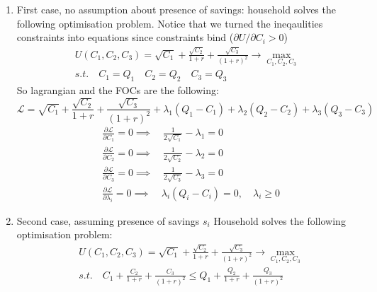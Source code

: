 \documentclass[11pt, oneside]{article}
\begin{document}
\begin{enumerate}[(1)]
	\item First case, no assumption about presence of savings:
	household solves the following optimisation problem. Notice that we turned the ineqaulities constraints into equations since constraints bind ($ \partial U/ \partial C_{i} > 0 $)
	\begin{gather*}
	U(C_{1}, C_{2}, C_{3}) =  \sqrt{C_{1}} + \frac{\sqrt{C_{2}}}{1+r} + \frac{\sqrt{C_{3}}}{(1+r)^{2}} \to \max_{C_{1}, C_{2}, C_{3}}\\
	s.t. \quad C_{1} =Q_{1}  \quad C_{2} = Q_{2} \quad C_{3} = Q_{3}	
	\end{gather*}
	So lagrangian and the FOCs are the following:
	\[
	\mathcal{L} = \sqrt{C_{1}} + \frac{\sqrt{C_{2}}}{1+r} + \frac{\sqrt{C_{3}}}{(1+r)^{2}} + \lambda_{1} ( Q_{1} - C_{1}) + \lambda_{2} (Q_{2} - C_{2}) + \lambda_{3} (Q_{3} - C_{3} )
	\]
	\begin{align*}
	&\frac{\partial \mathcal{L}}{\partial C_{1}} = 0 \implies \quad \frac{1}{2\sqrt{C_{1}}} - \lambda_{1} = 0\\
	&\frac{\partial \mathcal{L}}{\partial C_{2}} = 0 \implies \quad \frac{1}{2\sqrt{C_{2}}} - \lambda_{2} = 0 \\
	&\frac{\partial \mathcal{L}}{\partial C_{3}} = 0 \implies \quad \frac{1}{2\sqrt{C_{3}}} - \lambda_{3} = 0 \\
	&\frac{\partial \mathcal{L}}{\partial \lambda_{i}} = 0 \implies \quad \lambda_{i} (Q_{i} - C_{i})  = 0, \quad \lambda_{i} \ge 0
	\end{align*}
	

\item Second case, assuming presence of savings $ s_{i} $
Household solves the following optimisation problem:
\begin{align*}
&U(C_{1}, C_{2}, C_{3}) =  \sqrt{C_{1}} + \frac{\sqrt{C_{2}}}{1+r} + \frac{\sqrt{C_{3}}}{(1+r)^{2}} \to \max_{C_{1}, C_{2}, C_{3}}\\
&s.t. \quad C_{1} + \frac{C_{2}}{1+r} +\frac{C_{3}}{(1+r)^{2}} \le Q_{1} + \frac{Q_{2}}{1+r} + \frac{Q_{3}}{(1+r)^{2}}
\end{align*}


\end{enumerate}
\end{document}
